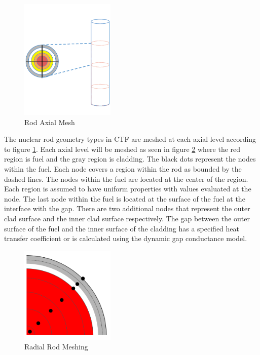 \begin{figure}[!h]
	\centering
	\includegraphics[width=0.40\textwidth]{images/rod-axial.png}
	\caption{Rod Axial Mesh}
	\label{fig:rod-axial}
\end{figure}

The nuclear rod geometry types in CTF are meshed at each axial level according
to figure \ref{fig:rod-axial}. Each axial level will be meshed as seen in figure
\ref{fig:radial_diagram} where the red region is fuel and the gray region is
cladding. The black dots represent the nodes within the fuel. Each node covers
a region within the rod as bounded by the dashed lines. The nodes within the
fuel are located at the center of the region. Each region is assumed to have
uniform properties with values evaluated at the node. The last node within  the
fuel is located at the surface of the fuel at the interface with the gap. 
There are two additional nodes that represent the outer clad surface and the
inner  clad surface respectively. The gap between the outer surface of the fuel
and the inner surface of the cladding has a specified heat transfer coefficient
or is calculated using the dynamic gap conductance model.

	\begin{figure}[!h]
		\centering
		\includegraphics[width=0.40\textwidth]{images/radial_diagram.png}
		\caption{Radial Rod Meshing}
		\label{fig:radial_diagram}
	\end{figure}
	
